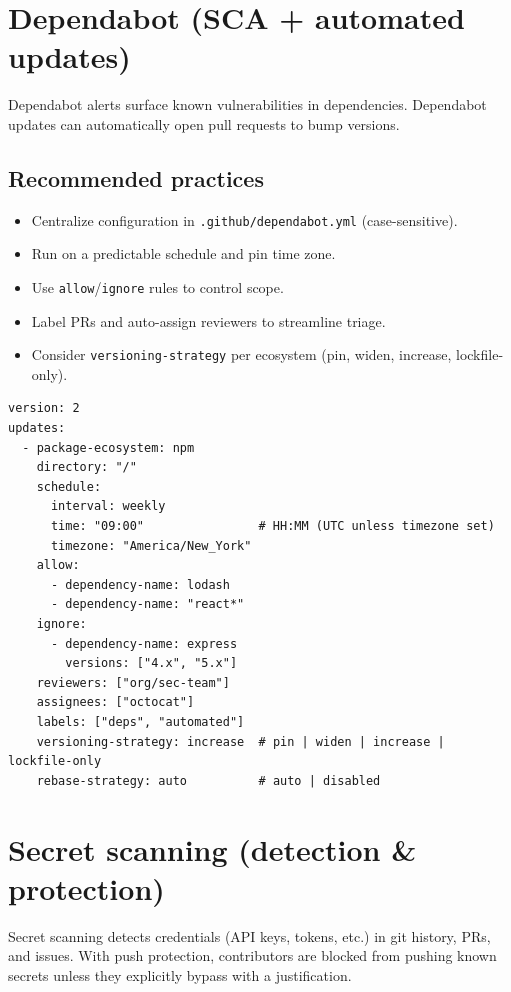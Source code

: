 \documentclass[11pt]{article}
\begin{document}
\section{Dependabot (SCA + automated updates)}
Dependabot alerts surface known vulnerabilities in dependencies. Dependabot updates can automatically open pull requests to bump versions.

\subsection{Recommended practices}
\begin{itemize}
  \item Centralize configuration in \texttt{.github/dependabot.yml} (case-sensitive).
  \item Run on a predictable schedule and pin time zone.
  \item Use \texttt{allow}/\texttt{ignore} rules to control scope.
  \item Label PRs and auto-assign reviewers to streamline triage.
  \item Consider \texttt{versioning-strategy} per ecosystem (pin, widen, increase, lockfile-only).
\end{itemize}

\begin{listing}[H]
\caption{\texttt{.github/dependabot.yml} (Node.js example)}
\begin{verbatim}
version: 2
updates:
  - package-ecosystem: npm
    directory: "/"
    schedule:
      interval: weekly
      time: "09:00"                # HH:MM (UTC unless timezone set)
      timezone: "America/New_York"
    allow:
      - dependency-name: lodash
      - dependency-name: "react*"
    ignore:
      - dependency-name: express
        versions: ["4.x", "5.x"]
    reviewers: ["org/sec-team"]
    assignees: ["octocat"]
    labels: ["deps", "automated"]
    versioning-strategy: increase  # pin | widen | increase | lockfile-only
    rebase-strategy: auto          # auto | disabled
\end{verbatim}
\end{listing}
\newpage

\section{Secret scanning (detection \& protection)}
Secret scanning detects credentials (API keys, tokens, etc.) in git history, PRs, and issues. With push protection, contributors are blocked from pushing known secrets unless they explicitly bypass with a justification.
\end{document}
